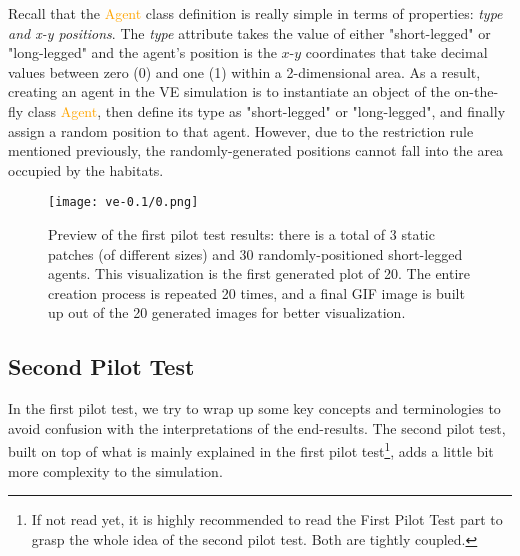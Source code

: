 Recall that the \textcolor{orange}{Agent} class definition is really simple in terms of properties: \emph{type and x-y positions}. The \emph{type} attribute takes the value of either "short-legged" or "long-legged" and the agent's position is the $x$-$y$ coordinates that take decimal values between zero (0) and one (1) within a 2-dimensional area. As a result, creating an agent in the VE simulation is to instantiate an object of the on-the-fly class \textcolor{orange}{Agent}, then define its type as "short-legged" or "long-legged", and finally assign a random position to that agent. However, due to the restriction rule mentioned previously, the randomly-generated positions cannot fall into the area occupied by the habitats.



\begin{figure}[h!]
    \centering
    \texttt{[image: ve-0.1/0.png]}
    \caption{Preview of the first pilot test results: there is a total of 3 static patches (of different sizes) and 30 randomly-positioned short-legged agents. This visualization is the first generated plot of 20. The entire creation process is repeated 20 times, and a final GIF image is built up out of the 20 generated images for better visualization.}
    \label{fig:pilot-test-1}
\end{figure}

\subsection{Second Pilot Test}
In the first pilot test, we try to wrap up some key concepts and terminologies to avoid confusion with the interpretations of the end-results. The second pilot test, built on top of what is mainly explained in the first pilot test\footnote{If not read yet, it is highly recommended to read the First Pilot Test part to grasp the whole idea of the second pilot test. Both are tightly coupled.}, adds a little bit more complexity to the simulation.

